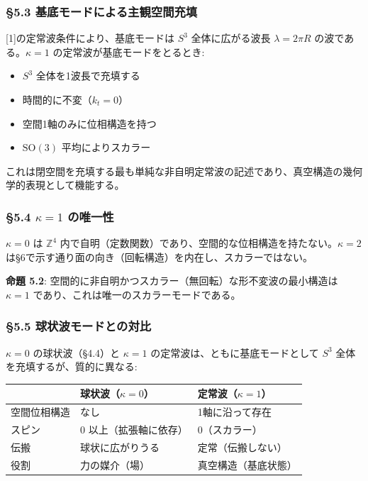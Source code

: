 \documentclass[
  a4paper,11pt]{ltjsarticle}
\newcounter{none}
\providecommand{\tightlist}{%
  \setlength{\itemsep}{0pt}\setlength{\parskip}{0pt}}
\theoremstyle{definition}
\theoremstyle{remark}
\begin{document}
\subsubsection{§5.3
基底モードによる主観空間充填}\label{ux57faux5e95ux30e2ux30fcux30c9ux306bux3088ux308bux4e3bux89b3ux7a7aux9593ux5145ux586b}

{[}1{]}の定常波条件により、基底モードは \(S^3\) 全体に広がる波長
\(\lambda = 2\pi R\) の波である。\(\kappa = 1\)
の定常波が基底モードをとるとき:

\begin{itemize}
\tightlist
\item
  \(S^3\) 全体を1波長で充填する
\item
  時間的に不変（\(k_t = 0\)）
\item
  空間1軸のみに位相構造を持つ
\item
  \(\mathrm{SO}(3)\) 平均によりスカラー
\end{itemize}

これは閉空間を充填する最も単純な非自明定常波の記述であり、真空構造の幾何学的表現として機能する。

\subsubsection{\texorpdfstring{§5.4 \(\kappa = 1\)
の唯一性}{§5.4 \textbackslash kappa = 1 の唯一性}}\label{kappa-1-ux306eux552fux4e00ux6027}

\(\kappa = 0\) は \(\mathbb{Z}^4\)
内で自明（定数関数）であり、空間的な位相構造を持たない。\(\kappa = 2\)
は§6で示す通り面の向き（回転構造）を内在し、スカラーではない。

\textbf{命題 5.2}:
空間的に非自明かつスカラー（無回転）な形不変波の最小構造は
\(\kappa = 1\) であり、これは唯一のスカラーモードである。

\subsubsection{§5.5
球状波モードとの対比}\label{ux7403ux72b6ux6ce2ux30e2ux30fcux30c9ux3068ux306eux5bfeux6bd4}

\(\kappa = 0\) の球状波（§4.4）と \(\kappa = 1\)
の定常波は、ともに基底モードとして \(S^3\)
全体を充填するが、質的に異なる:

{\def\LTcaptype{none} %
\begin{longtable}[]{@{}lll@{}}
\toprule\noalign{}
& 球状波（\(\kappa = 0\)） & 定常波（\(\kappa = 1\)） \\
\midrule\noalign{}
\endhead
\bottomrule\noalign{}
\endlastfoot
空間位相構造 & なし & 1軸に沿って存在 \\
スピン & 0 以上（拡張軸に依存） & 0（スカラー） \\
伝搬 & 球状に広がりうる & 定常（伝搬しない） \\
役割 & 力の媒介（場） & 真空構造（基底状態） \\
\end{longtable}
}
\end{document}

